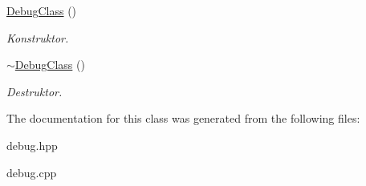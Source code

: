 \begin{DoxyCompactItemize}
\mbox{\label{classtfp_1_1_debug_class_a5d24ffb7e8f56955fcc00672186f0615}} 
\mbox{\hyperlink{classtfp_1_1_debug_class_a5d24ffb7e8f56955fcc00672186f0615}{Debug\+Class}} ()
\begin{DoxyCompactList}\small\item\em Konstruktor. \end{DoxyCompactList}\item 
\mbox{\label{classtfp_1_1_debug_class_aa475e7cd69f8f9ee8e20a2539aa5ea1c}} 
\mbox{\hyperlink{classtfp_1_1_debug_class_aa475e7cd69f8f9ee8e20a2539aa5ea1c}{$\sim$\+Debug\+Class}} ()
\begin{DoxyCompactList}\small\item\em Destruktor. \end{DoxyCompactList}\end{DoxyCompactItemize}


The documentation for this class was generated from the following files\+:\begin{DoxyCompactItemize}
\item 
debug.\+hpp\item 
debug.\+cpp\end{DoxyCompactItemize}
